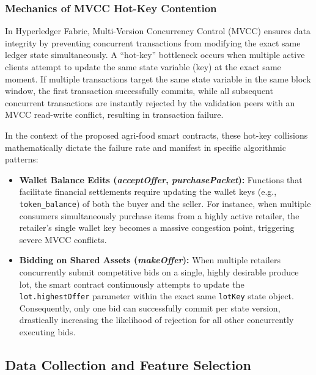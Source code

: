 \documentclass[12pt]{article}
\begin{document}
  \subsubsection{Mechanics of MVCC Hot-Key Contention}
  In Hyperledger Fabric, Multi-Version Concurrency Control (MVCC) ensures data integrity by preventing concurrent transactions from modifying the exact same ledger state simultaneously. A ``hot-key'' bottleneck occurs when multiple active clients attempt to update the same state variable (key) at the exact same moment. If multiple transactions target the same state variable in the same block window, the first transaction successfully commits, while all subsequent concurrent transactions are instantly rejected by the validation peers with an MVCC read-write conflict, resulting in transaction failure.
  
  In the context of the proposed agri-food smart contracts, these hot-key collisions mathematically dictate the failure rate and manifest in specific algorithmic patterns:
  \begin{itemize}
      \item \textbf{Wallet Balance Edits (\textit{acceptOffer}, \textit{purchasePacket}):} Functions that facilitate financial settlements require updating the wallet keys (e.g., \texttt{token\_balance}) of both the buyer and the seller. For instance, when multiple consumers simultaneously purchase items from a highly active retailer, the retailer's single wallet key becomes a massive congestion point, triggering severe MVCC conflicts.
      \item \textbf{Bidding on Shared Assets (\textit{makeOffer}):} When multiple retailers concurrently submit competitive bids on a single, highly desirable produce lot, the smart contract continuously attempts to update the \texttt{lot.highestOffer} parameter within the exact same \texttt{lotKey} state object. Consequently, only one bid can successfully commit per state version, drastically increasing the likelihood of rejection for all other concurrently executing bids.
  \end{itemize}
   
  
  \subsection{Data Collection and Feature Selection}
\end{document}

